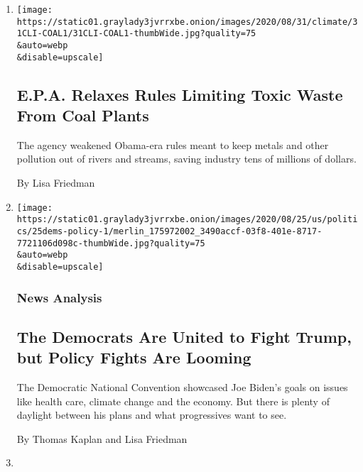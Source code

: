 \begin{enumerate}
\def\labelenumi{\arabic{enumi}.}
\item
  \href{/2020/08/31/climate/trump-coal-plants.html}{}

  \texttt{[image: https://static01.graylady3jvrrxbe.onion/images/2020/08/31/climate/31CLI-COAL1/31CLI-COAL1-thumbWide.jpg?quality=75\\\&auto=webp\\\&disable=upscale]}

  \hypertarget{epa-relaxes-rules-limiting-toxic-waste-from-coal-plants}{%
  \subsection{E.P.A. Relaxes Rules Limiting Toxic Waste From Coal
  Plants}\label{epa-relaxes-rules-limiting-toxic-waste-from-coal-plants}}

  The agency weakened Obama-era rules meant to keep metals and other
  pollution out of rivers and streams, saving industry tens of millions
  of dollars.

  By Lisa Friedman
\item
  \href{/2020/08/25/us/politics/democrats-policy-fights.html}{}

  \texttt{[image: https://static01.graylady3jvrrxbe.onion/images/2020/08/25/us/politics/25dems-policy-1/merlin\_175972002\_3490accf-03f8-401e-8717-7721106d098c-thumbWide.jpg?quality=75\\\&auto=webp\\\&disable=upscale]}

  \hypertarget{news-analysis}{%
  \subsubsection{News Analysis}\label{news-analysis}}

  \hypertarget{the-democrats-are-united-to-fight-trump-but-policy-fights-are-looming}{%
  \subsection{The Democrats Are United to Fight Trump, but Policy Fights
  Are
  Looming}\label{the-democrats-are-united-to-fight-trump-but-policy-fights-are-looming}}

  The Democratic National Convention showcased Joe Biden's goals on
  issues like health care, climate change and the economy. But there is
  plenty of daylight between his plans and what progressives want to
  see.

  By Thomas Kaplan and Lisa Friedman
\item
  \href{/2020/08/18/us/elections/bidens-climate-donors-counter-trumps-fossil-fuel-money.html}{}


\end{enumerate}

